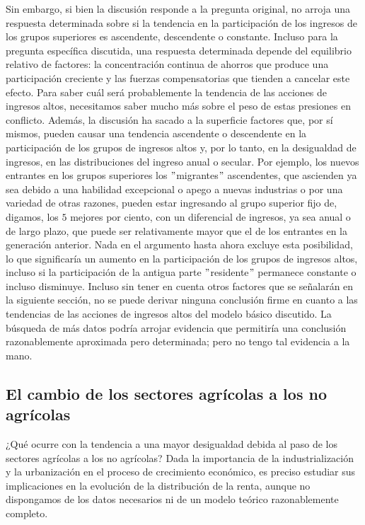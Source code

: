 Sin embargo, si bien la discusión responde a la pregunta original, no arroja una respuesta determinada sobre si la tendencia en la participación de los ingresos de los grupos superiores es ascendente, descendente o constante. Incluso para la pregunta específica discutida, una respuesta determinada depende del equilibrio relativo de factores: la concentración continua de ahorros que produce una participación creciente y las fuerzas compensatorias que tienden a cancelar este efecto. 
Para saber cuál será probablemente la tendencia de las acciones de ingresos altos, necesitamos saber mucho más sobre el peso de estas presiones en conflicto. Además, la discusión ha sacado a la superficie factores que, por sí mismos, pueden causar una tendencia ascendente o descendente en la participación de los grupos de ingresos altos y, por lo tanto, en la desigualdad de ingresos, en las distribuciones del ingreso anual o secular. 
Por ejemplo, los nuevos entrantes en los grupos superiores los $"$migrantes$"$ ascendentes, que ascienden ya sea debido a una habilidad excepcional o apego a nuevas industrias o por una variedad de otras razones, pueden estar ingresando al grupo superior fijo de, digamos, los $5$ mejores por ciento,  con un diferencial de ingresos, ya sea anual o de largo plazo, que puede ser relativamente mayor que el de los entrantes en la generación anterior. 
Nada en el argumento hasta ahora excluye esta posibilidad, lo que significaría un aumento en la participación de los grupos de ingresos altos, incluso si la participación de la antigua parte $"$residente$"$ permanece constante o incluso disminuye. Incluso sin tener en cuenta otros factores que se señalarán en la siguiente sección, no se puede derivar ninguna conclusión firme en cuanto a las tendencias de las acciones de ingresos altos del modelo básico discutido. La búsqueda de más datos podría arrojar evidencia que permitiría una conclusión razonablemente aproximada pero determinada; pero no tengo tal evidencia a la mano.

\subsection*{El cambio de los sectores agrícolas a los no agrícolas}
¿Qué ocurre con la tendencia a una mayor desigualdad debida al paso de los sectores agrícolas a los no agrícolas? Dada la importancia de la industrialización y la urbanización en el proceso de crecimiento económico, es preciso estudiar sus implicaciones en la evolución de la distribución de la renta, aunque no dispongamos de los datos necesarios ni de un modelo teórico razonablemente completo.\\

